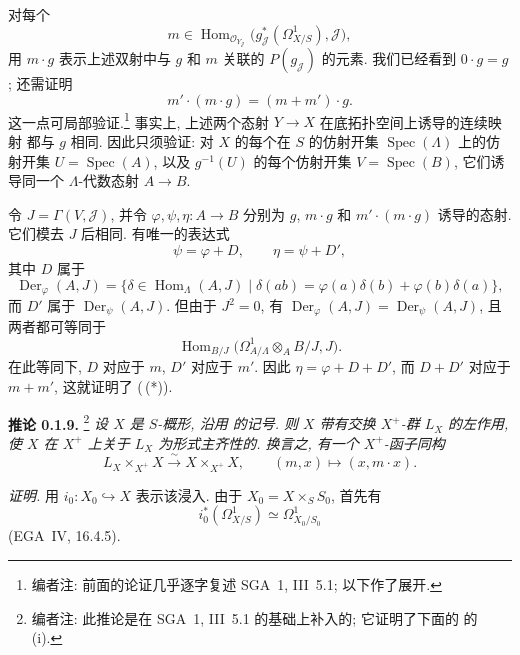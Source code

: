 对每个
\[
 m\in
 \operatorname{Hom}_{\mathscr O_{Y_{\mathscr J}}}
 \bigl(g_{\mathscr J}^*(\Omega^1_{X/S}),\mathscr J\bigr),
\]
用 \(m\cdot g\) 表示上述双射中与 \(g\) 和 \(m\) 关联的
\(P(g_{\mathscr J})\) 的元素. 我们已经看到 \(0\cdot g=g\);
还需证明
\begin{equation}
 m'\cdot(m\cdot g)=(m+m')\cdot g.
 \tag{0.1.8\,(*)}\label{sga3:iii:theorem:0-1-8:equation:0-1-8-star}
\end{equation}
这一点可局部验证.\footnote{编者注: 前面的论证几乎逐字复述
SGA~1, III~5.1; 以下作了展开.}
事实上, 上述两个态射 \(Y\to X\) 在底拓扑空间上诱导的连续映射
都与 \(g\) 相同. 因此只须验证: 对 \(X\) 的每个在 \(S\) 的仿射开集
\(\operatorname{Spec}(\Lambda)\) 上的仿射开集
\(U=\operatorname{Spec}(A)\), 以及 \(g^{-1}(U)\) 的每个仿射开集
\(V=\operatorname{Spec}(B)\), 它们诱导同一个 \(\Lambda\)-代数态射
\(A\to B\).

令 \(J=\Gamma(V,\mathscr J)\), 并令
\(\varphi,\psi,\eta:A\to B\) 分别为 \(g\), \(m\cdot g\)
和 \(m'\cdot(m\cdot g)\) 诱导的态射. 它们模去 \(J\) 后相同.
有唯一的表达式
\[
 \psi=\varphi+D,
 \qquad
 \eta=\psi+D',
\]
其中 \(D\) 属于
\[
 \operatorname{Der}_{\varphi}(A,J)
 =\{\delta\in\operatorname{Hom}_{\Lambda}(A,J)
   \mid \delta(ab)=\varphi(a)\delta(b)+\varphi(b)\delta(a)\},
\]
而 \(D'\) 属于 \(\operatorname{Der}_{\psi}(A,J)\).
但由于 \(J^2=0\), 有 \(\operatorname{Der}_{\varphi}(A,J)
 =\operatorname{Der}_{\psi}(A,J)\), 且两者都可等同于
\[
 \operatorname{Hom}_{B/J}
 \bigl(\Omega^1_{A/\Lambda}\otimes_AB/J,J\bigr).
\]
在此等同下, \(D\) 对应于 \(m\), \(D'\) 对应于 \(m'\).
因此 \(\eta=\varphi+D+D'\), 而 \(D+D'\) 对应于 \(m+m'\),
这就证明了 (\,(*)).

\medskip
\noindent{}\textbf{推论 0.1.9.}
\footnote{编者注: 此推论是在 SGA~1, III~5.1 的基础上补入的;
它证明了下面的  的 (i).}
\textit{设 \(X\) 是 \(S\)-概形, 沿用
 的记号.
则 \(X\) 带有交换 \(X^+\)-群 \(L_X\) 的左作用, 使 \(X\)
在 \(X^+\) 上关于 \(L_X\) 为形式主齐性的.
换言之, 有一个 \(X^+\)-函子同构}
\[
 L_X\times_{X^+}X\xrightarrow{\sim}X\times_{X^+}X,
 \qquad
 (m,x)\longmapsto(x,m\cdot x).
\]

\noindent\textit{证明.}
用 \(i_0:X_0\hookrightarrow X\) 表示该浸入.
由于 \(X_0=X\times_SS_0\), 首先有
\[
 i_0^*(\Omega^1_{X/S})\simeq\Omega^1_{X_0/S_0}
\]
(EGA~IV, 16.4.5).

